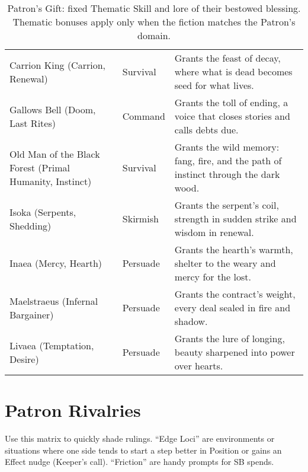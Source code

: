 \begin{table}[H]
\begin{tabular}{@{}p{3.8cm}p{3.8cm}p{7.5cm}@{}}
  Carrion King (Carrion, Renewal) & Survival & Grants the feast of decay, where what is dead becomes seed for what lives. \\
  Gallows Bell (Doom, Last Rites) & Command & Grants the toll of ending, a voice that closes stories and calls debts due. \\
  Old Man of the Black Forest (Primal Humanity, Instinct) & Survival & Grants the wild memory: fang, fire, and the path of instinct through the dark wood. \\
  Isoka (Serpents, Shedding) & Skirmish & Grants the serpent’s coil, strength in sudden strike and wisdom in renewal. \\
  Inaea (Mercy, Hearth) & Persuade & Grants the hearth’s warmth, shelter to the weary and mercy for the lost. \\
  Maelstraeus (Infernal Bargainer) & Persuade & Grants the contract’s weight, every deal sealed in fire and shadow. \\
  Livaea (Temptation, Desire) & Persuade & Grants the lure of longing, beauty sharpened into power over hearts. \\
  \bottomrule
  \end{tabular}
  \caption{Patron’s Gift: fixed Thematic Skill and lore of their bestowed blessing. Thematic bonuses apply only when the fiction matches the Patron’s domain.}
  \label{tab:gift-thematic-map}
  \end{table}
  


\section*{Patron Rivalries}
\label{app:patron-rivalries}

Use this matrix to quickly shade rulings. “Edge Loci” are environments or situations where one side tends to start a step better in Position or gains an Effect nudge (Keeper’s call). “Friction” are handy prompts for SB spends.

\renewcommand{\arraystretch}{1.15}
\setlength{\LTpre}{0pt}
\setlength{\LTpost}{0pt}

